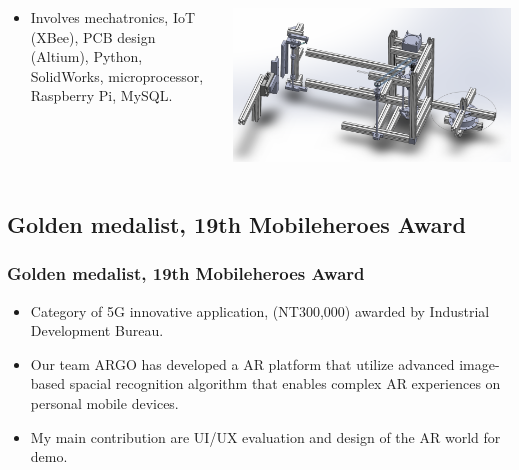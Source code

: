 \documentclass[compress]{beamer}
\begin{document}
\begin{frame}
    \begin{columns}
        \begin{column}{0.5\linewidth}
            \begin{itemize}
                \item Involves mechatronics, IoT (XBee), PCB design (Altium), Python, SolidWorks, microprocessor, Raspberry Pi, MySQL.
            \end{itemize}
        \end{column}
        \begin{column}{0.5\linewidth}
            \includegraphics[width=\linewidth]{pestMachine.png}
        \end{column}
    \end{columns}
\end{frame}

\subsection{Golden medalist, 19th Mobileheroes Award}
\begin{frame}
    \frametitle{Golden medalist, 19th Mobileheroes Award}
    \begin{itemize}
        \item Category of 5G innovative application, (NT300,000) awarded by Industrial Development Bureau.
        \item Our team ARGO has developed a AR platform that utilize advanced image-based spacial recognition algorithm that enables complex AR experiences on personal mobile devices.
        \item My main contribution are UI/UX evaluation and design of the AR world for demo.
    \end{itemize}
\end{frame}
\end{document}
